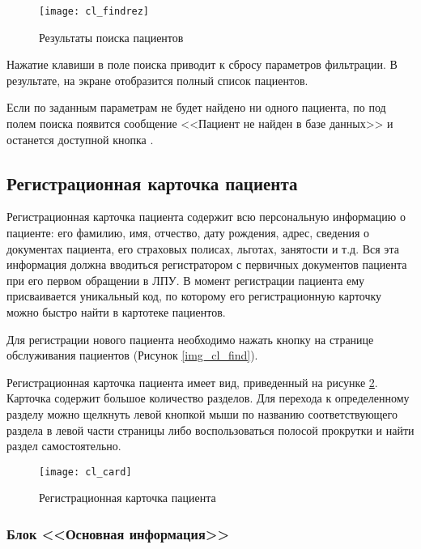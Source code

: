 \begin{figure}[ht]\centering
 \texttt{[image: cl\_findrez]}
 \caption{Результаты поиска пациентов}
 \label{img_cl_findrez}
\end{figure} 

\begin{vnim}
Нажатие клавиши  в поле поиска приводит к сбросу параметров фильтрации. В результате, на экране отобразится полный список пациентов.
\end{vnim}

Если по заданным параметрам не будет найдено ни одного пациента, по под полем поиска появится сообщение <<Пациент не найден в базе данных>> и останется доступной кнопка .

\subsection{Регистрационная карточка пациента} \label{cl_card}

Регистрационная карточка пациента содержит всю персональную информацию о пациенте: его фамилию, имя, отчество, дату рождения, адрес, сведения о документах пациента, его страховых полисах, льготах, занятости и т.д. Вся эта информация должна вводиться регистратором с первичных документов пациента при его первом обращении в ЛПУ. В момент регистрации пациента ему присваивается уникальный код, по которому его регистрационную карточку можно быстро найти в картотеке пациентов.

Для регистрации нового пациента необходимо нажать кнопку  на странице обслуживания пациентов (Рисунок \ref{img_cl_find}). 

Регистрационная карточка пациента имеет вид, приведенный на рисунке \ref{img_cl_card}. Карточка содержит большое количество разделов. Для перехода к определенному разделу можно щелкнуть левой кнопкой мыши по названию соответствующего раздела в левой части страницы либо воспользоваться полосой прокрутки и найти раздел самостоятельно.  

\begin{figure}[ht]\centering
 \texttt{[image: cl\_card]}
 \caption{Регистрационная карточка пациента}
 \label{img_cl_card}
\end{figure} 

\subsubsection{Блок <<Основная информация>>}

